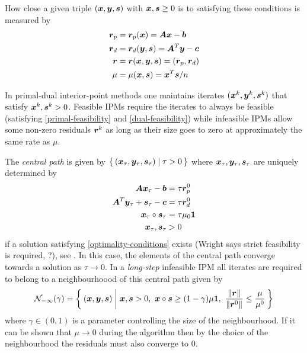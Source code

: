 How close a given triple \((\bm{x}, \bm{y}, \bm{s})\) with \(\bm{x}, \bm{s} \geq 0\) is to satisfying these conditions is measured by
\begin{subequations}
  \begin{align}
    \bm{r}_p &= \bm{r}_p(\bm{x}) = \bm{A}\bm{x} - \bm{b} \\
    \bm{r}_d &= \bm{r}_d(\bm{y}, \bm{s}) = \bm{A}^T \bm{y} - \bm{c} \\
    \bm{r}   &= \bm{r}(\bm{x}, \bm{y}, \bm{s}) = (\bm{r}_p, \bm{r}_d) \\
    \mu       &= \mu(\bm{x}, \bm{s}) = \bm{x}^T \bm{s} / n
  \end{align}
\end{subequations}

In primal-dual interior-point methods one maintains iterates \((\bm{x}^k, \bm{y}^k, \bm{s}^k)\) that satisfy \(\bm{x}^k, \bm{s}^k > 0\).
Feasible IPMs require the iterates to always be feasible (satisfying \cref{primal-feasibility} and \cref{dual-feasibility}) while infeasible IPMs allow some non-zero residuals \(\bm{r}^k\) as long as their size goes to zero at approximately the same rate as \(\mu\).

The \emph{central path} is given by \(\Set{(\bm{x}_\tau, \bm{y}_\tau, \bm{s}_\tau) | \tau > 0}\) where \(\bm{x}_\tau, \bm{y}_\tau, \bm{s}_\tau\) are uniquely determined by
\begin{subequations}
  \begin{align}
    \bm{A}\bm{x}_\tau - \bm{b} &= \tau \bm{r}_p^0 \\
    \bm{A}^T \bm{y}_\tau + \bm{s}_\tau - \bm{c} &= \tau \bm{r}_d^0 \\
    \bm{x}_\tau \circ \bm{s}_\tau &= \tau \mu_0 \bm{1} \\
    \bm{x}_\tau, \bm{s}_\tau &> 0
  \end{align}
\end{subequations}
if a solution satisfying \cref{optimality-conditions} exists (Wright says strict feasibility is required, ?), see \cite{Mizuno-PolynomialTimeConvergenceInexactIPM}.
In this case, the elements of the central path converge towards a solution as \(\tau \to 0\).
In a \emph{long-step} infeasible IPM all iterates are required to belong to a neighbourhoood of this central path given by
\begin{equation}
  \mathcal{N}_{-\infty}(\gamma) = \Set{ (\bm{x}, \bm{y}, \bm{s}) | \bm{x}, \bm{s} > 0, \ \bm{x} \circ \bm{s} \geq (1 - \gamma) \mu \bm{1}, \ \frac{\lVert \bm{r} \rVert}{\lVert \bm{r}^0 \rVert} \leq \frac{\mu}{\mu^0} }
\end{equation}
where \(\gamma \in (0, 1)\) is a parameter controlling the size of the neighbourhood.
If it can be shown that \(\mu \to 0\) during the algorithm then by the choice of the neighbourhood the residuals must also converge to \(0\).

